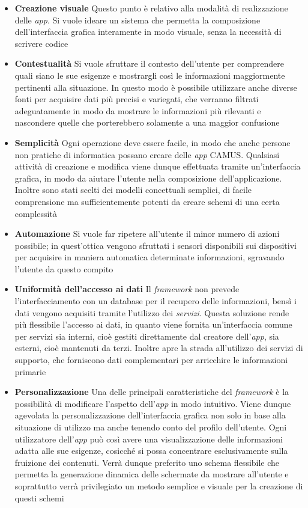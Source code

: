 \begin{itemize}
	\item \textbf{Creazione visuale}
	Questo punto è relativo alla modalità di realizzazione delle \emph{app}. Si vuole ideare un sistema che permetta la composizione dell'interfaccia grafica interamente in modo visuale, senza la necessità di scrivere codice
	\item \textbf{Contestualità}
	Si vuole sfruttare il contesto dell'utente per comprendere quali siano le sue esigenze e mostrargli così le informazioni maggiormente pertinenti alla situazione. In questo modo è possibile utilizzare anche diverse fonti per acquisire dati più precisi e variegati, che verranno filtrati adeguatamente in modo da mostrare le informazioni più rilevanti e nascondere quelle che porterebbero solamente a una maggior confusione
	\item \textbf{Semplicità}
	Ogni operazione deve essere facile, in modo che anche persone non pratiche di informatica possano creare delle \emph{app} CAMUS. Qualsiasi attività di creazione e modifica viene dunque effettuata tramite un'interfaccia grafica, in modo da aiutare l'utente nella composizione dell'applicazione. Inoltre sono stati scelti dei modelli concettuali semplici, di facile comprensione ma sufficientemente potenti da creare schemi di una certa complessità
	\item \textbf{Automazione}
	Si vuole far ripetere all'utente il minor numero di azioni possibile; in quest'ottica vengono sfruttati i sensori disponibili sui dispositivi per acquisire in maniera automatica determinate informazioni, sgravando l'utente da questo compito
	\item \textbf{Uniformità dell'accesso ai dati}
	Il \emph{framework} non prevede l'interfacciamento con un database per il recupero delle informazioni, bensì i dati vengono acquisiti tramite l'utilizzo dei \emph{servizi}. Questa soluzione rende più flessibile l'accesso ai dati, in quanto viene fornita un'interfaccia comune per servizi sia interni, cioè gestiti direttamente dal creatore dell'\emph{app}, sia esterni, cioè mantenuti da terzi. Inoltre apre la strada all'utilizzo dei servizi di supporto, che forniscono dati complementari per arricchire le informazioni primarie
	\item \textbf{Personalizzazione}
	Una delle principali caratteristiche del \emph{framework} è la possibilità di modificare l'aspetto dell'\emph{app} in modo intuitivo. Viene dunque agevolata la personalizzazione dell'interfaccia grafica non solo in base alla situazione di utilizzo ma anche tenendo conto del profilo dell'utente. Ogni utilizzatore dell'\emph{app} può così avere una visualizzazione delle informazioni adatta alle sue esigenze, cosicché si possa concentrare esclusivamente sulla fruizione dei contenuti. Verrà dunque preferito uno schema flessibile che permetta la generazione dinamica delle schermate da mostrare all'utente e soprattutto verrà privilegiato un metodo semplice e visuale per la creazione di questi schemi

\end{itemize}
